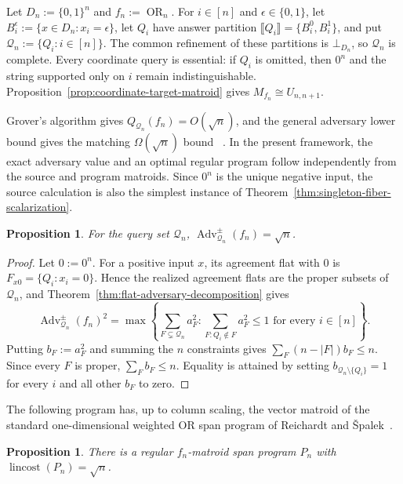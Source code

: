 \documentclass[11pt]{article}
\numberwithin{equation}{section}
\newtheorem{proposition}[definition]{Proposition}
\theoremstyle{remark}
\begin{document}
Let $D_n:=\{0,1\}^n$ and $f_n:=\operatorname{OR}_n$. For
$i\in[n]$ and $\epsilon\in\{0,1\}$, let
$B_i^\epsilon:=\{x\in D_n:x_i=\epsilon\}$, let $Q_i$ have answer partition
$\llbracket Q_i\rrbracket=\{B_i^0,B_i^1\}$, and put
$\mathcal Q_n:=\{Q_i:i\in[n]\}$. The common refinement of these partitions is
$\bot_{D_n}$, so $\mathcal Q_n$ is complete. Every coordinate query is
essential: if $Q_i$ is omitted, then $0^n$ and the string supported only on
$i$ remain indistinguishable. Proposition~\ref{prop:coordinate-target-matroid}
gives $M_{f_n}\cong U_{n,n+1}$.

Grover's algorithm gives $Q_{\mathcal Q_n}(f_n)=O(\sqrt n)$, and the
general adversary lower bound gives the matching $\Omega(\sqrt n)$ bound
~\cite{Grover1996,HoyerLeeSpalek2007}. In the present framework, the exact
adversary value and an optimal regular program follow independently from the
source and program matroids. Since $0^n$ is the unique negative input, the
source calculation is also the simplest instance of
Theorem~\ref{thm:singleton-fiber-scalarization}.

\begin{proposition}
\label{prop:grover-source-value}
For the query set $\mathcal Q_n$,
$\operatorname{Adv}^{\pm}_{\mathcal Q_n}(f_n)=\sqrt n$.
\end{proposition}

\begin{proof}
Let $0:=0^n$. For a positive input $x$, its agreement flat with $0$ is
$F_{x0}=\{Q_i:x_i=0\}$. Hence the realized agreement flats are the proper
subsets of $\mathcal Q_n$, and Theorem~\ref{thm:flat-adversary-decomposition}
gives
\begin{equation}
    \operatorname{Adv}^{\pm}_{\mathcal Q_n}(f_n)^2
    =
    \max\left\{
        \sum_{F\subsetneq\mathcal Q_n} a_F^2:
        \sum_{F:Q_i\notin F} a_F^2\leq1\text{ for every }i\in[n]
    \right\}.
\end{equation}
Putting $b_F:=a_F^2$ and summing the $n$ constraints gives
$\sum_F(n-|F|)b_F\leq n$. Since every $F$ is proper,
$\sum_F b_F\leq n$. Equality is attained by setting
$b_{\mathcal Q_n\setminus\{Q_i\}}=1$ for every $i$ and all other $b_F$ to
zero.
\end{proof}

The following program has, up to column scaling, the vector matroid of the
standard one-dimensional weighted OR span program of Reichardt and
{\v S}palek~\cite{ReichardtSpalek2008}.

\begin{proposition}
\label{prop:grover-program-value}
There is a regular $f_n$-matroid span program $P_n$ with
$\operatorname{lincost}(P_n)=\sqrt n$.
\end{proposition}
\end{document}
